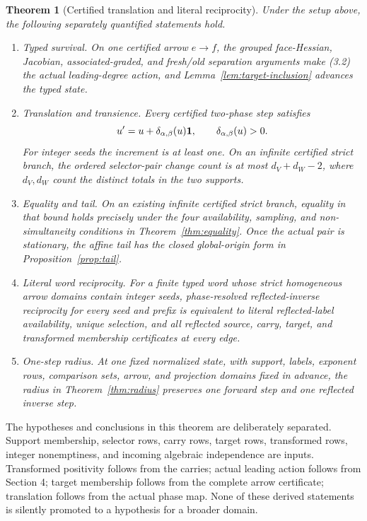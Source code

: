 \documentclass[11pt]{article}
\newtheorem{theorem}{Theorem}[section]
\theoremstyle{definition}
\theoremstyle{remark}
\begin{document}
\begin{theorem}[Certified translation and literal reciprocity]
\label{thm:main}
Under the setup above, the following separately quantified statements hold.
\begin{enumerate}[label=(\Alph*)]
\item \emph{Typed survival.}  On one certified arrow
\(e\to f\), the grouped face-Hessian, Jacobian, associated-graded, and
fresh/old separation arguments make (3.2) the actual leading-degree action,
and Lemma~\ref{lem:target-inclusion} advances the typed state.
\item \emph{Translation and transience.}  Every certified two-phase step
satisfies
\[
 u'=u+\delta_{\alpha,\beta}(u)\mathbf{1},\qquad
 \delta_{\alpha,\beta}(u)>0.
\]
For integer seeds the increment is at least one.  On an infinite certified
strict branch, the ordered selector-pair change count is at most
\(d_V+d_W-2\), where \(d_V,d_W\) count the distinct totals in the two
supports.
\item \emph{Equality and tail.}  On an existing infinite certified strict
branch, equality in that bound holds precisely under the four availability,
sampling, and non-simultaneity conditions in
Theorem~\ref{thm:equality}.  Once the actual pair is stationary, the affine
tail has the closed global-origin form in Proposition~\ref{prop:tail}.
\item \emph{Literal word reciprocity.}  For a finite typed word whose
strict homogeneous arrow domains contain integer seeds, phase-resolved
reflected-inverse reciprocity for every seed and prefix is equivalent to
literal reflected-label availability, unique selection, and all reflected
source, carry, target, and transformed membership certificates at every
edge.
\item \emph{One-step radius.}  At one fixed normalized state, with support,
labels, exponent rows, comparison sets, arrow, and projection domains fixed
in advance, the radius in Theorem~\ref{thm:radius} preserves one forward
step and one reflected inverse step.
\end{enumerate}
\end{theorem}

The hypotheses and conclusions in this theorem are deliberately separated.
Support membership, selector rows, carry rows, target rows, transformed
rows, integer nonemptiness, and incoming algebraic independence are inputs.
Transformed positivity follows from the carries; actual leading action
follows from Section 4; target membership follows from the complete arrow
certificate; translation follows from the actual phase map.  None of these
derived statements is silently promoted to a hypothesis for a broader
domain.
\end{document}
